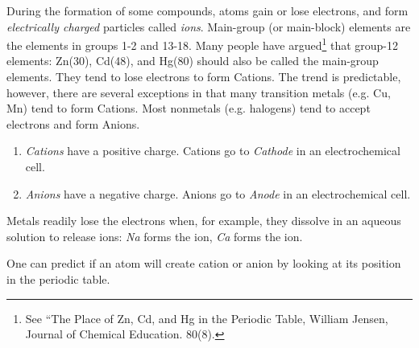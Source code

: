 \documentclass{article}
\begin{document}
During the formation of some compounds, atoms gain or lose electrons, and form \emph{electrically charged} particles called \emph{ions}. Main-group (or main-block) elements are the elements in groups 1-2 and 13-18. Many people have argued\footnote{See ``The Place of Zn, Cd, and Hg in the Periodic Table, William Jensen, Journal of Chemical Education. 80(8).} that group-12 elements: Zn(30), Cd(48), and Hg(80) should also be called the main-group elements. They tend to lose electrons to form Cations. The trend is predictable, however, there are several exceptions in that many transition metals (e.g. Cu, Mn) tend to form Cations. Most nonmetals (e.g. halogens) tend to accept electrons and form Anions. 
\begin{enumerate}
    \item \emph{Cations} have a positive charge. Cations go to \emph{Cathode} in an electrochemical cell.
    \item \emph{Anions} have a negative charge. Anions go to \emph{Anode} in an electrochemical cell.
\end{enumerate}

Metals readily lose the electrons when, for example, they dissolve in an aqueous solution to release ions: \emph{Na} forms the  ion, \emph{Ca} forms the  ion.

One can predict if an atom will create cation or anion by looking at its position in the periodic table.
\end{document}
